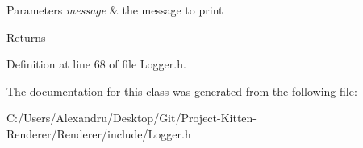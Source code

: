 \begin{DoxyParams}{Parameters}
{\em message} & the message to print \\
\hline
\end{DoxyParams}
\begin{DoxyReturn}{Returns}

\end{DoxyReturn}


Definition at line 68 of file Logger.\+h.



The documentation for this class was generated from the following file\+:\begin{DoxyCompactItemize}
\item 
C\+:/\+Users/\+Alexandru/\+Desktop/\+Git/\+Project-\/\+Kitten-\/\+Renderer/\+Renderer/include/Logger.\+h\end{DoxyCompactItemize}
